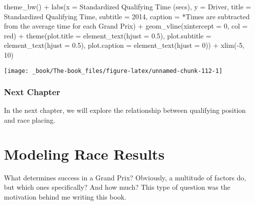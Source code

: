 \documentclass[
]{book}
\newenvironment{Shaded}{\begin{snugshade}}{\end{snugshade}}
\newcommand{\AttributeTok}[1]{\textcolor[rgb]{0.77,0.63,0.00}{#1}}
\newcommand{\DecValTok}[1]{\textcolor[rgb]{0.00,0.00,0.81}{#1}}
\newcommand{\FloatTok}[1]{\textcolor[rgb]{0.00,0.00,0.81}{#1}}
\newcommand{\FunctionTok}[1]{\textcolor[rgb]{0.00,0.00,0.00}{#1}}
\newcommand{\NormalTok}[1]{#1}
\newcommand{\SpecialCharTok}[1]{\textcolor[rgb]{0.00,0.00,0.00}{#1}}
\newcommand{\StringTok}[1]{\textcolor[rgb]{0.31,0.60,0.02}{#1}}
\begin{document}
\begin{Shaded}
\begin{Highlighting}[]
  \FunctionTok{theme\_bw}\NormalTok{() }\SpecialCharTok{+}
  \FunctionTok{labs}\NormalTok{(}\AttributeTok{x =} \StringTok{\textquotesingle{}Standardized Qualifying Time (secs)\textquotesingle{}}\NormalTok{,}
       \AttributeTok{y =} \StringTok{\textquotesingle{}Driver\textquotesingle{}}\NormalTok{,}
       \AttributeTok{title =} \StringTok{\textquotesingle{}Standardized Qualifying Time\textquotesingle{}}\NormalTok{,}
       \AttributeTok{subtitle =} \StringTok{\textquotesingle{}2014\textquotesingle{}}\NormalTok{,}
       \AttributeTok{caption =} \StringTok{\textquotesingle{}*Times are subtracted from the average time for each Grand Prix\textquotesingle{}}\NormalTok{) }\SpecialCharTok{+}
  \FunctionTok{geom\_vline}\NormalTok{(}\AttributeTok{xintercept =} \DecValTok{0}\NormalTok{, }\AttributeTok{col =} \StringTok{\textquotesingle{}red\textquotesingle{}}\NormalTok{) }\SpecialCharTok{+}
  \FunctionTok{theme}\NormalTok{(}\AttributeTok{plot.title =} \FunctionTok{element\_text}\NormalTok{(}\AttributeTok{hjust =} \FloatTok{0.5}\NormalTok{),}
        \AttributeTok{plot.subtitle =} \FunctionTok{element\_text}\NormalTok{(}\AttributeTok{hjust =} \FloatTok{0.5}\NormalTok{),}
        \AttributeTok{plot.caption =} \FunctionTok{element\_text}\NormalTok{(}\AttributeTok{hjust =} \DecValTok{0}\NormalTok{)) }\SpecialCharTok{+}
  \FunctionTok{xlim}\NormalTok{(}\SpecialCharTok{{-}}\DecValTok{5}\NormalTok{, }\DecValTok{10}\NormalTok{)}
\end{Highlighting}
\end{Shaded}

\begin{center}\texttt{[image: \_book/The-book\_files/figure-latex/unnamed-chunk-112-1]} \end{center}

\hypertarget{next-chapter-3}{%
\subsection{Next Chapter}\label{next-chapter-3}}

In the next chapter, we will explore the relationship between qualifying position and race placing.

\hypertarget{modeling-race-results}{%
\chapter{Modeling Race Results}\label{modeling-race-results}}

What determines success in a Grand Prix? Obviously, a multitude of factors do, but which ones specifically? And how much? This type of question was the motivation behind me writing this book.
\end{document}
